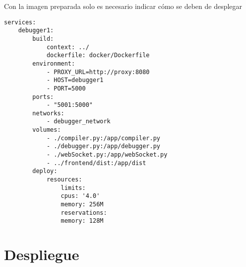 Con la imagen preparada solo es necesario indicar cómo se deben de desplegar 

\begin{lstlisting}
services:
    debugger1:
        build:
            context: ../ 
            dockerfile: docker/Dockerfile
        environment:
            - PROXY_URL=http://proxy:8080 
            - HOST=debugger1
            - PORT=5000
        ports:
            - "5001:5000"
        networks:
            - debugger_network
        volumes:
            - ./compiler.py:/app/compiler.py
            - ./debugger.py:/app/debugger.py
            - ./webSocket.py:/app/webSocket.py
            - ../frontend/dist:/app/dist  
        deploy:
            resources:
                limits:
                cpus: '4.0'
                memory: 256M
                reservations:
                memory: 128M
\end{lstlisting}



\section{Despliegue} \label{sec:despliegue}

